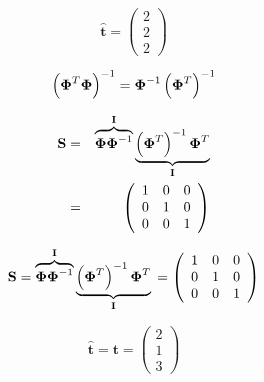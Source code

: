 \documentclass[10pt,twoside]{book}
\newcommand{\bldgr}[1]{{\mbox{\boldmath {${#1}$}}}} %
\newcommand{\fat}[1]{\mathbf{#1}} %
\newcommand{\transp}{^T} %
\begin{document}
$$
 \fat{\hat{t}}
  = 
\left(
               \begin{array}{c}
                 2 \\
                 2 \\
                 2
               \end{array}
             \right)
$$

$$ 
  \left( \bldgr{\Phi}\transp \bldgr{\Phi} \right)^{-1} 
  = \bldgr{\Phi}^{-1} \left( \bldgr{\Phi}\transp \right)^{-1}
$$

\begin{eqnarray*}
  \fat{S} 
  & = & 
  \overbrace{
  \bldgr{\Phi} \bldgr{\Phi}^{-1} }^{\fat{I}} 
  \underbrace{
  \left( \bldgr{\Phi}\transp \right)^{-1} \bldgr{\Phi}\transp }_{\fat{I}}
  \\
  & = &
\left(
               \begin{array}{ccc}
                 1 & 0 & 0\\
                 0 & 1 & 0 \\
                 0 & 0 & 1
               \end{array}
             \right)
\end{eqnarray*}

$$
\fat{S} 
=
  \overbrace{
  \bldgr{\Phi} \bldgr{\Phi}^{-1} }^{\fat{I}} 
  \underbrace{
  \left( \bldgr{\Phi}\transp \right)^{-1} \bldgr{\Phi}\transp }_{\fat{I}}
  \\
=
\left(
               \begin{array}{ccc}
                 1 & 0 & 0\\
                 0 & 1 & 0 \\
                 0 & 0 & 1
               \end{array}
             \right)
$$

$$
\fat{\hat{t}} = \fat{t} 
= \left(
               \begin{array}{c}
                 2 \\
                 1 \\
                 3
               \end{array}
             \right)
$$
\end{document}
